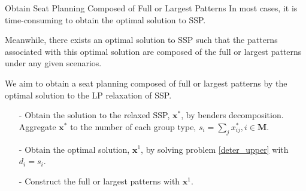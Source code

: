\begin{frame}{Obtain Seat Planning Composed of Full or Largest Patterns}
  In most cases, it is time-consuming to obtain the optimal solution to SSP. 
  \vspace{0.5cm}

  Meanwhile, there exists an optimal solution to SSP such that the patterns associated with this optimal solution are composed of the full or largest patterns under any given scenarios.
  \vspace{0.5cm}

  We aim to obtain a seat planning composed of full or largest patterns by the optimal solution to the LP relaxation of SSP.

  \begin{itemize}
    \item[-] Obtain the solution to the relaxed SSP, $\mathbf{x}^{*}$, by benders decomposition. Aggregate $\mathbf{x}^{*}$ to the number of each group type, ${s}_{i} =\sum_{j} x^{*}_{ij}, i \in \mathbf{M}$.

    \item[-] Obtain the optimal solution, $\mathbf{x}^{1}$, by solving problem \eqref{deter_upper} with $d_{i} = {s}_{i}$. 
     
    \item[-] Construct the full or largest patterns with $\mathbf{x}^{1}$.
 \end{itemize}
\end{frame}
